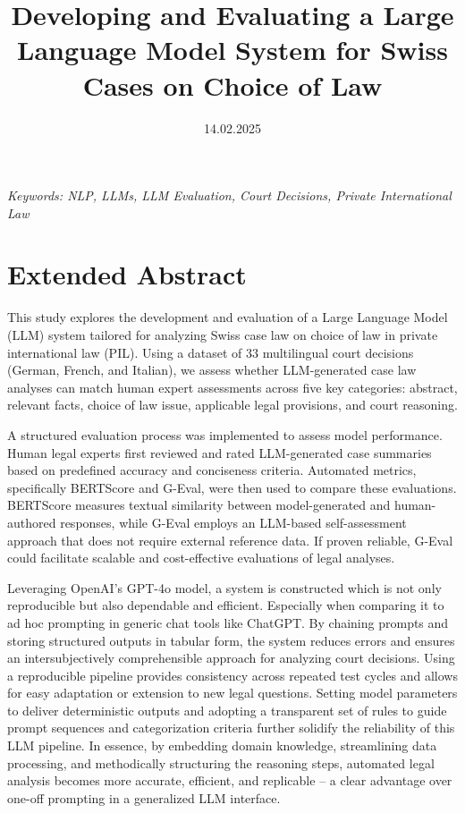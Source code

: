 \documentclass[a4paper,12pt]{article}
\title{Developing and Evaluating a Large Language Model System for Swiss Cases on Choice of Law}
\date{14.02.2025}
\begin{document}
\maketitle
\thispagestyle{fancy}

\begin{center}
\textit{Keywords: NLP, LLMs, LLM Evaluation, Court Decisions, Private International Law}
\newline
\end{center}

\section*{Extended Abstract}

This study explores the development and evaluation of a Large Language Model (LLM) system tailored for analyzing Swiss case law on choice of law in private international law (PIL). Using a dataset of 33 multilingual court decisions (German, French, and Italian), we assess whether LLM-generated case law analyses can match human expert assessments across five key categories: abstract, relevant facts, choice of law issue, applicable legal provisions, and court reasoning.

A structured evaluation process was implemented to assess model performance. Human legal experts first reviewed and rated LLM-generated case summaries based on predefined accuracy and conciseness criteria. Automated metrics, specifically BERTScore and G-Eval, were then used to compare these evaluations. BERTScore measures textual similarity between model-generated and human-authored responses, while G-Eval employs an LLM-based self-assessment approach that does not require external reference data. If proven reliable, G-Eval could facilitate scalable and cost-effective evaluations of legal analyses.

Leveraging OpenAI’s GPT-4o model, a system is constructed which is not only reproducible but also dependable and efficient. Especially when comparing it to ad hoc prompting in generic chat tools like ChatGPT. By chaining prompts and storing structured outputs in tabular form, the system reduces errors and ensures an intersubjectively comprehensible approach for analyzing court decisions. Using a reproducible pipeline provides consistency across repeated test cycles and allows for easy adaptation or extension to new legal questions. Setting model parameters to deliver deterministic outputs and adopting a transparent set of rules to guide prompt sequences and categorization criteria further solidify the reliability of this LLM pipeline. In essence, by embedding domain knowledge, streamlining data processing, and methodically structuring the reasoning steps, automated legal analysis becomes more accurate, efficient, and replicable – a clear advantage over one-off prompting in a generalized LLM interface.
\end{document}
